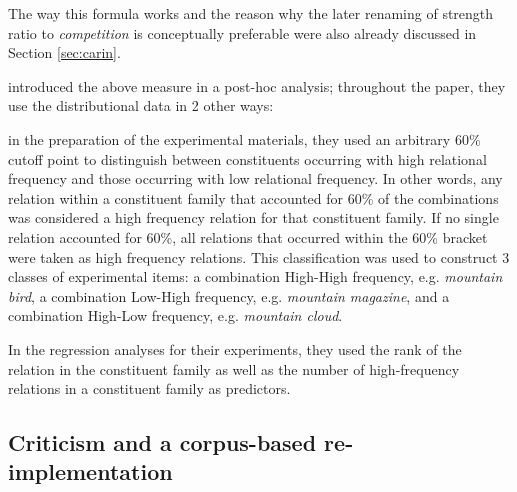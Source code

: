 The way this formula works and the reason why the later renaming of strength
ratio to
\emph{competition} is conceptually preferable were also already
discussed in Section
\ref{sec:carin}. 

\citet{GagneandShoben:1997} introduced the above measure
in a post-hoc analysis; throughout the paper, they use the distributional data in 2 other ways:
\begin{inparaenum}[(1)]
\item in the preparation of the experimental materials, they used an
  arbitrary 60\% cutoff point to distinguish between constituents
  occurring with high relational frequency and those occurring with low
  relational frequency. In other words, any
relation within a constituent family that accounted for 60\% of the
combinations was considered a high frequency relation for that
constituent family. If no single relation accounted for 60\%, all
relations that occurred within the 60\% bracket were taken as high
frequency relations. This classification was used to construct
3 classes of experimental items: a combination High-High
frequency, e.g. \emph{mountain bird}, a combination Low-High frequency, e.g.
\emph{mountain magazine}, and a combination
High-Low frequency, e.g. \emph{mountain cloud}.
\item In the regression analyses for their experiments, they used 
the rank of the relation in the constituent family as well as the
number of high-frequency relations in a constituent family as
predictors.
\end{inparaenum}




\subsection{Criticism and a corpus-based re-implementation}
\label{sec:relationalFamilies2}

